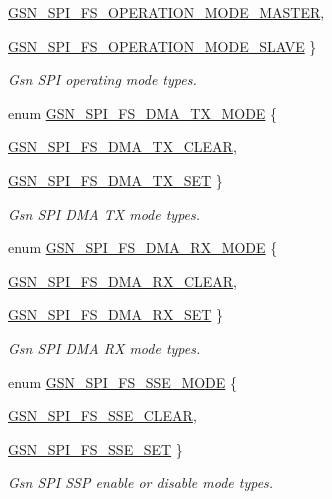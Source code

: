 \begin{DoxyCompactItemize}
\hyperlink{a00655_gga9ef97e579e4f3e5d828b8bc2c0c58d73a8384efdb14ec2cc720231e0a1c5c1c76}{GSN\_\-SPI\_\-FS\_\-OPERATION\_\-MODE\_\-MASTER}, 
\par
\hyperlink{a00655_gga9ef97e579e4f3e5d828b8bc2c0c58d73ac713886b7dd46c5b7366e2677e1d98db}{GSN\_\-SPI\_\-FS\_\-OPERATION\_\-MODE\_\-SLAVE}
 \}
\begin{DoxyCompactList}\small\item\em Gsn SPI operating mode types. \end{DoxyCompactList}\item 
enum \hyperlink{a00655_ga6654fba1f3e49677837484ec989da884}{GSN\_\-SPI\_\-FS\_\-DMA\_\-TX\_\-MODE} \{ \par
\hyperlink{a00655_gga6654fba1f3e49677837484ec989da884a9dae0ab51b4931f56156f93dca78b31f}{GSN\_\-SPI\_\-FS\_\-DMA\_\-TX\_\-CLEAR}, 
\par
\hyperlink{a00655_gga6654fba1f3e49677837484ec989da884a2201371d0d6269e540a78344bf34dd9d}{GSN\_\-SPI\_\-FS\_\-DMA\_\-TX\_\-SET}
 \}
\begin{DoxyCompactList}\small\item\em Gsn SPI DMA TX mode types. \end{DoxyCompactList}\item 
enum \hyperlink{a00655_ga82f3e42cd7181328045726b29cf916c6}{GSN\_\-SPI\_\-FS\_\-DMA\_\-RX\_\-MODE} \{ \par
\hyperlink{a00655_gga82f3e42cd7181328045726b29cf916c6ab399a79e14f5345e99aa6f4e5f7b2f45}{GSN\_\-SPI\_\-FS\_\-DMA\_\-RX\_\-CLEAR}, 
\par
\hyperlink{a00655_gga82f3e42cd7181328045726b29cf916c6acd22f6b1874ec9399c493ca0c281c534}{GSN\_\-SPI\_\-FS\_\-DMA\_\-RX\_\-SET}
 \}
\begin{DoxyCompactList}\small\item\em Gsn SPI DMA RX mode types. \end{DoxyCompactList}\item 
enum \hyperlink{a00655_ga9d787cd2d26e81bd00ce1a1392958e27}{GSN\_\-SPI\_\-FS\_\-SSE\_\-MODE} \{ \par
\hyperlink{a00655_gga9d787cd2d26e81bd00ce1a1392958e27abfb75ca8d636e5bfd3cd1d54918804b2}{GSN\_\-SPI\_\-FS\_\-SSE\_\-CLEAR}, 
\par
\hyperlink{a00655_gga9d787cd2d26e81bd00ce1a1392958e27a53bc3a08b866507b2d1fb02ea7018f01}{GSN\_\-SPI\_\-FS\_\-SSE\_\-SET}
 \}
\begin{DoxyCompactList}\small\item\em Gsn SPI SSP enable or disable mode types. \end{DoxyCompactList}\item 

\end{DoxyCompactItemize}
